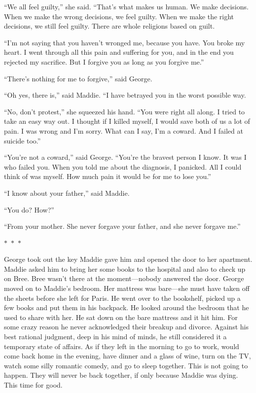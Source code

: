 \documentclass{memoir}
\newcommand{\starbreak}{%
\begin{center}
  $\ast$~$\ast$~$\ast$
\end{center}
}
\begin{document}
``We all feel guilty,'' she said. ``That's what makes us human. We make decisions. When we make the wrong decisions, we feel guilty. When we make the right decisions, we still feel guilty. There are whole religions based on guilt. 

``I'm not saying that you haven't wronged me, because you have. You broke my heart. I went through all this pain and suffering for you, and in the end you rejected my sacrifice. But I forgive you as long as you forgive me.''

``There's nothing for me to forgive,'' said George.

``Oh yes, there is,'' said Maddie. ``I have betrayed you in the worst possible way. 

``No, don't protest,'' she squeezed his hand. ``You were right all along. I tried to take an easy way out. I thought if I killed myself, I would save both of us a lot of pain. I was wrong and I'm sorry. What can I say, I'm a coward. And I failed at suicide too.''

``You're not a coward,'' said George. ``You're the bravest person I know. It was I who failed you. When you told me about the diagnosis, I panicked. All I could think of was myself. How much pain it would be for me to lose you.''

``I know about your father,'' said Maddie.

``You do? How?''

``From your mother. She never forgave your father, and she never forgave me.''

\starbreak

George took out the key Maddie gave him and opened the door to her apartment. Maddie asked him to bring her some books to the hospital and also to check up on Bree. Bree wasn't there at the moment---nobody answered the door. George moved on to Maddie's bedroom. Her mattress was bare---she must have taken off the sheets before she left for Paris. He went over to the bookshelf, picked up a few books and put them in his backpack. He looked around the bedroom that he used to share with her. He sat down on the bare mattress and it hit him. For some crazy reason he never acknowledged their breakup and divorce. Against his best rational judgment, deep in his mind of minds, he still considered it a temporary state of affairs. As if they left in the morning to go to work, would come back home in the evening, have dinner and a glass of wine, turn on the TV, watch some silly romantic comedy, and go to sleep together. This is not going to happen. They will never be back together, if only because Maddie was dying. This time for good.
\end{document}
